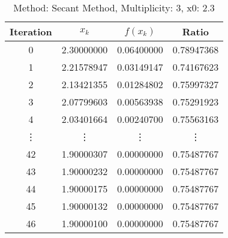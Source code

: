 \begin{table}
\centering
\caption{Method: Secant Method, Multiplicity: 3, x0: 2.3}
\label{tab:table_Secant_Method_3_2_3}
\begin{tabular}{c c c c}
\toprule
Iteration &      $x_k$ &   $f(x_k)$ &      Ratio \\
\midrule
        0 & 2.30000000 & 0.06400000 & 0.78947368 \\
        1 & 2.21578947 & 0.03149147 & 0.74167623 \\
        2 & 2.13421355 & 0.01284802 & 0.75997327 \\
        3 & 2.07799603 & 0.00563938 & 0.75291923 \\
        4 & 2.03401664 & 0.00240700 & 0.75563163 \\
   \vdots &     \vdots &     \vdots &     \vdots \\
       42 & 1.90000307 & 0.00000000 & 0.75487767 \\
       43 & 1.90000232 & 0.00000000 & 0.75487767 \\
       44 & 1.90000175 & 0.00000000 & 0.75487767 \\
       45 & 1.90000132 & 0.00000000 & 0.75487767 \\
       46 & 1.90000100 & 0.00000000 & 0.75487767 \\
\bottomrule
\end{tabular}
\end{table}
